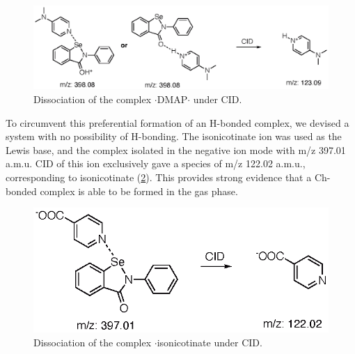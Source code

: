 \begin{refsection}
\begin{figure}
    \centering
    \includegraphics[scale=0.74]{Figures/pos-esi-ms.eps}
    \caption[Positive mode ESI of $ \cdot $DMAP$ \cdot $.]{Dissociation of the complex $ \cdot $DMAP$ \cdot $ under CID.}\label{fig:pos-esi-ms}
\end{figure}

To circumvent this preferential formation of an H-bonded complex, we devised a system with no possibility of H-bonding.
The isonicotinate ion was used as the Lewis base, and the complex isolated in the negative ion mode with m/z 397.01 a.m.u.
CID of this ion exclusively gave a species of m/z 122.02 a.m.u., corresponding to isonicotinate (\cref{fig:neg-esi-ms}).
This provides strong evidence that a Ch-bonded complex is able to be formed in the gas phase.

\begin{figure}
    \centering
    \includegraphics[scale=0.74]{Figures/neg-esi-ms.eps}
    \caption[Negative mode ESI of $ \cdot $isonicotinate.]{Dissociation of the complex $ \cdot $isonicotinate under CID.}\label{fig:neg-esi-ms}
\end{figure}


\end{refsection}
